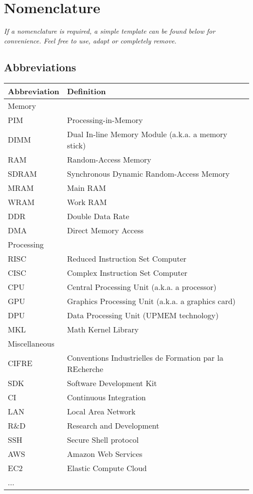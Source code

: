 \chapter*{Nomenclature}

\emph{If a nomenclature is required, a simple template can be found below for convenience. Feel free to use, adapt or completely remove.}

\section*{Abbreviations}

\begin{longtable}{p{2.5cm}p{8cm}}
    \toprule
    Abbreviation & Definition \\
    \midrule\midrule\endhead %
    Memory & \\
    \midrule
    PIM & Processing-in-Memory \\
    DIMM & Dual In-line Memory Module (a.k.a. a memory stick) \\
    RAM & Random-Access Memory \\
    SDRAM & Synchronous Dynamic Random-Access Memory \\
    MRAM & Main RAM \\
    WRAM & Work RAM \\
    DDR & Double Data Rate \\
    DMA & Direct Memory Access \\
    \midrule
    Processing & \\
    \midrule
    RISC & Reduced Instruction Set Computer \\
    CISC & Complex Instruction Set Computer \\
    CPU & Central Processing Unit (a.k.a. a processor) \\
    GPU & Graphics Processing Unit (a.k.a. a graphics card) \\
    DPU & Data Processing Unit (UPMEM technology) \\
    MKL & Math Kernel Library \\
    \midrule
    Miscellaneous & \\
    \midrule
    CIFRE & Conventions Industrielles de Formation par la REcherche \\
    SDK & Software Development Kit \\
    CI & Continuous Integration \\
    LAN & Local Area Network \\
    R\&D & Research and Development \\
    SSH & Secure Shell protocol \\
    AWS & Amazon Web Services \\
    EC2 & Elastic Compute Cloud \\
    ... \\
    \bottomrule
\end{longtable}

